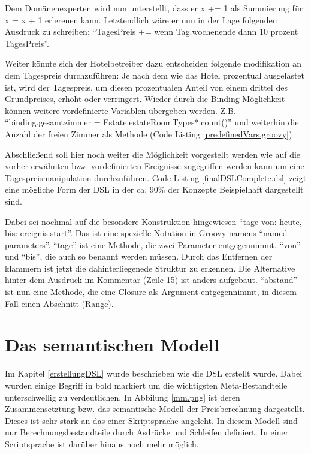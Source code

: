 \documentclass[11pt,english,ngerman, headsepline]{scrreprt}
\begin{document}

 
Dem Domänenexperten wird nun unterstellt, dass er x += 1 als Summierung für x =
x + 1 erlerenen kann. Letztendlich wäre er nun in der Lage folgenden Ausdruck zu
schreiben: ``TagesPreis += wenn Tag.wochenende dann 10 prozent TagesPreis''.
 
Weiter könnte sich der Hotelbetreiber dazu entscheiden folgende modifikation an
dem Tagespreis durchzuführen: Je nach dem wie das Hotel prozentual ausgelastet
ist, wird der Tagespreis, um diesen prozentualen Anteil von einem drittel des
Grundpreises, erhöht oder verringert.
Wieder durch die Binding-Möglichkeit können weitere vordefinierte Variablen
übergeben werden. Z.B. ``binding.gesamtzimmer =
Estate.estateRoomTypes*.count()'' und weiterhin die Anzahl der freien
Zimmer als Methode (Code Listing \ref{predefinedVars.groovy}) 


 
Abschließend soll hier noch weiter die Möglichkeit vorgestellt werden wie auf
die vorher erwähnten bzw. vordefinierten Ereignisse zugegriffen werden kann um
eine Tagespreismanipulation durchzuführen.
Code Listing \ref{finalDSLComplete.dsl} zeigt eine mögliche Form der DSL in der ca. 90\% der
Konzepte Beispielhaft dargestellt sind.  



Dabei sei nochmal auf die besondere Konstruktion hingewiesen ``tage von: heute,
bis: ereignis.start''. Das ist eine spezielle Notation in Groovy namens
``named parameters''. ``tage'' ist eine Methode, die zwei Parameter entgegennimmt.
``von'' und ``bis'', die auch so benannt werden müssen. Durch das Entfernen der
klammern ist jetzt die dahinterliegenede Struktur zu erkennen. Die Alternative hinter dem Ausdrück im
Kommentar (Zeile 15) ist anders aufgebaut. ``abstand'' ist nun eine Methode, die
eine Closure als Argument entgegennimmt, in diesem Fall einen Abschnitt
(Range).

\section{Das semantischen Modell}

Im Kapitel \ref{erstellungDSL} wurde beschrieben wie die DSL erstellt wurde.
Dabei wurden einige Begriff in bold markiert um die wichtigsten
Meta-Bestandteile unterschwellig zu verdeutlichen. In Abbilung \ref{mm.png}
ist deren Zusammensetztung bzw. das semantische Modell der Preisberechnung
dargestellt.
Dieses ist sehr stark an das einer Skriptsprache angeleht.
In diesem Modell sind nur Berechnungsbestandteile durch Asdrücke und Schleifen
definiert. In einer Scriptsprache ist darüber hinaus noch mehr möglich.
 
\end{document}
